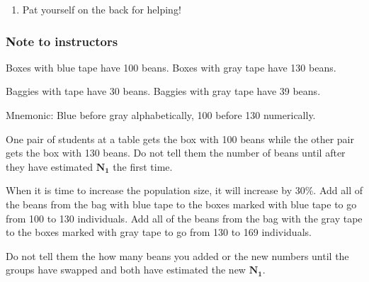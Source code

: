 \documentclass[12pt, hidelinks]{exam}
\newlength{\basespace}
\begin{document}
\begin{questions}
\begin{enumerate}
	\item Pat yourself on the back for helping!
	
\end{enumerate}
%
%
%
%

\end{questions}

\newpage

\ifprintanswers \bfseries

\subsubsection*{Note to instructors}

Boxes with blue tape have 100 beans. Boxes with gray tape have 130 beans.

Baggies with tape have 30 beans. Baggies with gray tape have 39 beans. 

Mnemonic: Blue before gray alphabetically, 100 before 130 numerically.




One pair of students at a table gets the box with 100 beans while the other pair gets the box with 130 beans. Do not tell them the number of beans until after they have estimated $\symbf{N_1}$ the first time.


When it is time to increase the population size, it will increase by 30\%.  Add all of the beans from the bag with blue tape to the boxes marked with blue tape to go from 100 to 130 individuals. Add all of the beans from the bag with the gray tape to the boxes marked with gray tape to go from 130 to 169 individuals.

Do not tell them the how many beans you added or the new numbers until the groups have swapped and both have estimated the new $\symbf{N_1}$.

\fi	
\end{document}
